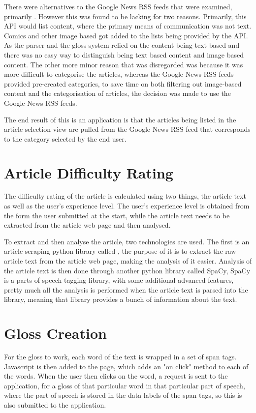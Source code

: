 There were alternatives to the Google News RSS feeds that were examined, primarily \textcite{newsapi}. However this was found to be lacking for two reasons. Primarily, this API would list content, where the primary means of communication was not text. Comics and other image based got added to the lists being provided by the API. As the parser and the gloss system relied on the content being text based and there was no easy way to distinguish being text based content and image based content. The other more minor reason that \textcite{newsapi} was disregarded was because it was more difficult to categorise the articles, whereas the Google News RSS feeds provided pre-created categories, to save time on both filtering out image-based content and the categorisation of articles, the decision was made to use the Google News RSS feeds. 

The end result of this is an application is that the articles being listed in the article selection view are pulled from the Google News RSS feed that corresponds to the category selected by the end user.

\section{Article Difficulty Rating}

The difficulty rating of the article is calculated using two things, the article text as well as the user's experience level. The user's experience level is obtained from the form the user submitted at the start, while the article text needs to be extracted from the article web page and then analysed.

To extract and then analyse the article, two technologies are used. The first is an article scraping python library called \textcite{newspaper}, the purpose of it is to extract the raw article text from the article web page, making the analysis of it easier. Analysis of the article text is then done through another python library called SpaCy, SpaCy is a parts-of-speech tagging library, with some additional advanced features, pretty much all the analysis is performed when the article text is parsed into the library, meaning that library provides a bunch of information about the text.


\section{Gloss Creation}

For the gloss to work, each word of the text is wrapped in a set of span tags. Javascript is then added to the page, which adds an "on click" method to each of the words. When the user then clicks on the word, a request is sent to the application, for a gloss of that particular word in that particular part of speech, where the part of speech is stored in the data labels of the span tags, so this is also submitted to the application.

